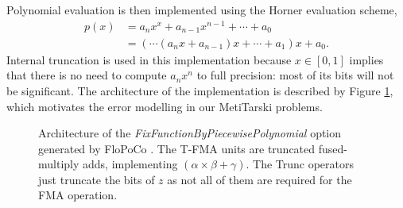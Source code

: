 \documentclass{fac}
\begin{document}
Polynomial evaluation is then implemented using the Horner evaluation scheme, 
\begin{align*}
    p(x) &= a_n x^x + a_{n-1}x^{n-1} + \cdots + a_0 \\
         &= (\cdots(a_n x + a_{n-1})x + \cdots + a_1)x + a_0.
\end{align*}
Internal truncation is used in this implementation because $x\in [0,1]$ implies that there is no need to compute $a_n x^n$ to full precision: most of its bits will not be significant. The architecture of the implementation is described by Figure \ref{horner_arch}, which motivates the error modelling in our MetiTarski problems.

\begin{figure}
\centering

\caption{Architecture of the \textit{FixFunctionByPiecewisePolynomial} option generated by FloPoCo \cite{DinJolPas2010-poly}. The T-FMA units are truncated fused-multiply adds, implementing $(\alpha\times \beta + \gamma)$. The Trunc operators just truncate the bits of $z$ as not all of them are required for the FMA operation.\label{horner_arch}}
\end{figure}
\end{document}

